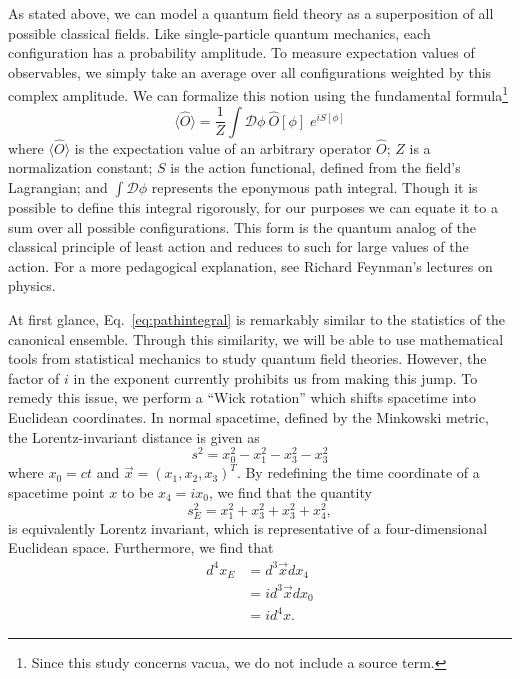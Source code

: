 \documentclass[12pt]{report}
\begin{document}
As stated above, we can model a quantum field theory as a superposition of all possible classical fields. Like single-particle quantum mechanics, each configuration has a probability amplitude. To measure expectation values of observables, we simply take an average over all configurations weighted by this complex amplitude. We can formalize this notion using the fundamental formula\footnote{Since this study concerns vacua, we do not include a source term.}
\begin{equation}
    \label{eq:pathintegral}
    \langle \hat O \rangle = \frac{1}{Z} \int \mathcal{D}\phi \: \hat O [\phi]\; e^{iS[\phi]}
\end{equation}
where $\langle \hat O \rangle$ is the expectation value of an arbitrary operator $\hat O$; $Z$ is a normalization constant; $S$ is the action functional, defined from the field's Lagrangian; and $\int \mathcal{D}\phi$ represents the eponymous path integral. Though it is possible to define this integral rigorously, for our purposes we can equate it to a sum over all possible configurations. This form is the quantum analog of the classical principle of least action and reduces to such for large values of the action. For a more pedagogical explanation, see Richard Feynman's lectures on physics.\cite{feynman1963a}

At first glance, Eq.~\ref{eq:pathintegral} is remarkably similar to the statistics of the canonical ensemble. Through this similarity, we will be able to use mathematical tools from statistical mechanics to study quantum field theories. However, the factor of $i$ in the exponent currently prohibits us from making this jump. To remedy this issue, we perform a ``Wick rotation'' which shifts spacetime into Euclidean coordinates. In normal spacetime, defined by the Minkowski metric, the Lorentz-invariant distance is given as
\begin{equation}
    s^2 = x^2_0 - x^2_1- x^2_3- x^2_3
\end{equation}
where $x_0=ct$ and $\vec{x} = (x_1, x_2, x_3)^T$. By redefining the time coordinate of a spacetime point $x$ to be $x_4=ix_0$, we find that the quantity
\begin{equation}
    s_E^2 = x^2_1+ x^2_3+ x^2_3 + x^2_4,
\end{equation}
is equivalently Lorentz invariant, which is representative of a four-dimensional Euclidean space. Furthermore, we find that
\begin{align}
    d^4x_E &= d^3\vec{x}dx_4 \\
    &= i d^3\vec{x}dx_0 \\
    &= i d^4x. \label{eq:wickdifferential}
\end{align}
\end{document}
